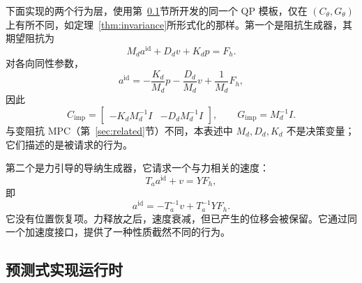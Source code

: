 \documentclass[journal]{IEEEtran}
\begin{document}
下面实现的两个行为层，使用第~\ref{sec:qp}节所开发的同一个 QP 模板，仅在 $(C_\theta,G_\theta)$ 上有所不同，如定理~\ref{thm:invariance}所形式化的那样。第一个是阻抗生成器，其期望阻抗为
\begin{equation}
M_d a^{\mathrm{id}}+D_dv+K_dp=F_h.
\end{equation}
对各向同性参数，
\begin{equation}
a^{\mathrm{id}} =-\frac{K_d}{M_d}p-\frac{D_d}{M_d}v+\frac{1}{M_d}F_h,
\end{equation}
因此
\begin{equation}
C_{\mathrm{imp}} =\begin{bmatrix} -K_dM_d^{-1}I&-D_dM_d^{-1}I \end{bmatrix},
\qquad G_{\mathrm{imp}}=M_d^{-1}I.
\end{equation}
与变阻抗 MPC（第~\ref{sec:related}节）不同，本表述中 $M_d,D_d,K_d$ 不是决策变量；它们描述的是被请求的行为。

第二个是力引导的导纳生成器，它请求一个与力相关的速度：
\begin{equation}
T_a a^{\mathrm{id}}+v=YF_h,
\end{equation}
即
\begin{equation}
a^{\mathrm{id}}=-T_a^{-1}v+T_a^{-1}YF_h.
\end{equation}
它没有位置恢复项。力释放之后，速度衰减，但已产生的位移会被保留。它通过同一个加速度接口，提供了一种性质截然不同的行为。

\subsection{预测式实现运行时}
\label{sec:qp}
\end{document}

